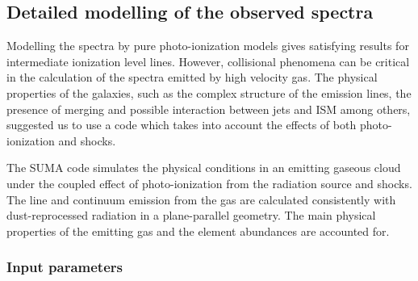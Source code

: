 \documentclass[../thesis.tex]{subfiles}
\begin{document}
\subsection{Detailed modelling of the observed spectra}
\label{sec:models}





Modelling the spectra by pure photo-ionization models gives satisfying results for intermediate ionization level lines.
However, collisional phenomena can be critical in the calculation of the spectra emitted by high velocity gas.
The physical properties of the galaxies, such as the complex structure of the emission lines, the presence of merging and possible interaction between jets and ISM among others, suggested us to use a code which takes into account the effects of both photo-ionization and shocks.

The SUMA code \citep[][and references therein]{Contini15} simulates the physical conditions in an emitting gaseous cloud under the coupled effect of photo-ionization from the radiation source and shocks. The line and continuum emission from the gas are calculated consistently with dust-reprocessed radiation in a plane-parallel geometry.
The main physical properties of the emitting gas and the element abundances are accounted for.

\subsubsection{Input parameters}
\end{document}
